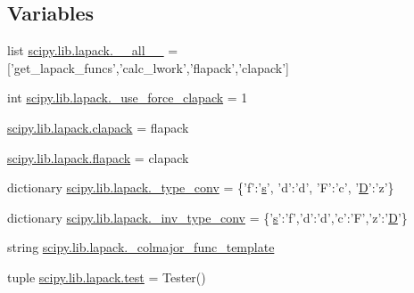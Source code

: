 \subsection*{Variables}
\begin{DoxyCompactItemize}
\item 
list \hyperlink{namespacescipy_1_1lib_1_1lapack_a60c194a2b3886ebf8ee2c9c4c4b8a1a6}{scipy.\+lib.\+lapack.\+\_\+\+\_\+all\+\_\+\+\_\+} = \mbox{[}'get\+\_\+lapack\+\_\+funcs','calc\+\_\+lwork','flapack','clapack'\mbox{]}
\item 
int \hyperlink{namespacescipy_1_1lib_1_1lapack_a418c18faa5abfaadbb064e74720fe51c}{scipy.\+lib.\+lapack.\+\_\+use\+\_\+force\+\_\+clapack} = 1
\item 
\hyperlink{namespacescipy_1_1lib_1_1lapack_abc1995130e6d984420c8f61bd7f92d67}{scipy.\+lib.\+lapack.\+clapack} = flapack
\item 
\hyperlink{namespacescipy_1_1lib_1_1lapack_a404c60aedd17287c494cd682f5a44c5d}{scipy.\+lib.\+lapack.\+flapack} = clapack
\item 
dictionary \hyperlink{namespacescipy_1_1lib_1_1lapack_a4fa2e27e96f0679788bfb6810fe70c8c}{scipy.\+lib.\+lapack.\+\_\+type\+\_\+conv} = \{'f'\+:'\hyperlink{indexexpr_8h_ae024b0db549122b44c349ae28ec990dc}{s}', 'd'\+:'d', 'F'\+:'c', '\hyperlink{odrpack_8h_a7dae6ea403d00f3687f24a874e67d139}{D}'\+:'z'\}
\item 
dictionary \hyperlink{namespacescipy_1_1lib_1_1lapack_a845c31e7b59895d3172fece0d9eba795}{scipy.\+lib.\+lapack.\+\_\+inv\+\_\+type\+\_\+conv} = \{'\hyperlink{indexexpr_8h_ae024b0db549122b44c349ae28ec990dc}{s}'\+:'f','d'\+:'d','c'\+:'F','z'\+:'\hyperlink{odrpack_8h_a7dae6ea403d00f3687f24a874e67d139}{D}'\}
\item 
string \hyperlink{namespacescipy_1_1lib_1_1lapack_a02a2ae7d53052e444d9c7935c2dc888a}{scipy.\+lib.\+lapack.\+\_\+colmajor\+\_\+func\+\_\+template}
\item 
tuple \hyperlink{namespacescipy_1_1lib_1_1lapack_a9d95f4042d7a0ec233c8598344c6a6cf}{scipy.\+lib.\+lapack.\+test} = Tester()
\end{DoxyCompactItemize}
